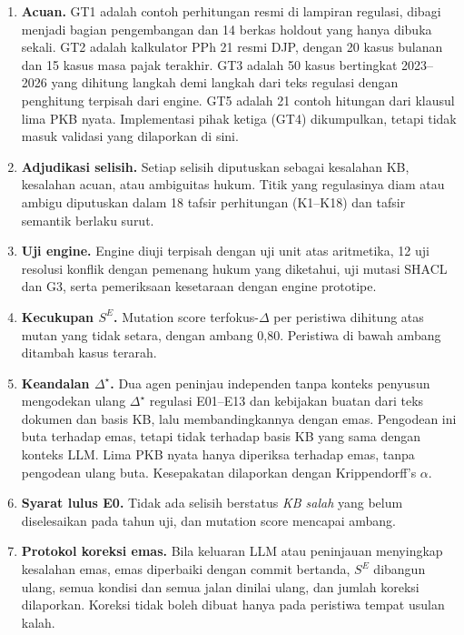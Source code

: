 \documentclass[journal,a4paper]{IEEEtran}
\makeatletter
\DeclareRobustCommand{\en}[1]{{\usefont{\f@encoding}{\f@family}{\f@series}{it}#1\/}}
\newcommand{\emas}{\star}
\newcommand{\SE}{S^{E}}
\makeatother
\begin{document}
\begin{enumerate}[leftmargin=*,nosep]
  \item \textbf{Acuan.} GT1 adalah contoh perhitungan resmi di lampiran regulasi, dibagi menjadi bagian pengembangan dan 14 berkas \en{holdout} yang hanya dibuka sekali. GT2 adalah kalkulator PPh 21 resmi DJP, dengan 20 kasus bulanan dan 15 kasus masa pajak terakhir. GT3 adalah 50 kasus bertingkat 2023--2026 yang dihitung langkah demi langkah dari teks regulasi dengan penghitung terpisah dari \en{engine}. GT5 adalah 21 contoh hitungan dari klausul lima PKB nyata. Implementasi pihak ketiga (GT4) dikumpulkan, tetapi tidak masuk validasi yang dilaporkan di sini.
  \item \textbf{Adjudikasi selisih.} Setiap selisih diputuskan sebagai kesalahan KB, kesalahan acuan, atau ambiguitas hukum. Titik yang regulasinya diam atau ambigu diputuskan dalam 18 tafsir perhitungan (K1--K18) dan tafsir semantik berlaku surut.
  \item \textbf{Uji \en{engine}.} \en{Engine} diuji terpisah dengan uji unit atas aritmetika, 12 uji resolusi konflik dengan pemenang hukum yang diketahui, uji mutasi SHACL dan G3, serta pemeriksaan kesetaraan dengan \en{engine} prototipe.
  \item \textbf{Kecukupan $\SE$.} \en{Mutation score} terfokus-$\Delta$ per peristiwa dihitung atas mutan yang tidak setara, dengan ambang 0,80. Peristiwa di bawah ambang ditambah kasus terarah.
  \item \textbf{Keandalan $\Delta^{\emas}$.} Dua agen peninjau independen tanpa konteks penyusun mengodekan ulang $\Delta^{\emas}$ regulasi E01--E13 dan kebijakan buatan dari teks dokumen dan basis KB, lalu membandingkannya dengan emas. Pengodean ini buta terhadap emas, tetapi tidak terhadap basis KB yang sama dengan konteks LLM. Lima PKB nyata hanya diperiksa terhadap emas, tanpa pengodean ulang buta. Kesepakatan dilaporkan dengan Krippendorff's $\alpha$.
  \item \textbf{Syarat lulus E0.} Tidak ada selisih berstatus \emph{KB salah} yang belum diselesaikan pada tahun uji, dan \en{mutation score} mencapai ambang.
  \item \textbf{Protokol koreksi emas.} Bila keluaran LLM atau peninjauan menyingkap kesalahan emas, emas diperbaiki dengan \en{commit} bertanda, $\SE$ dibangun ulang, semua kondisi dan semua jalan dinilai ulang, dan jumlah koreksi dilaporkan. Koreksi tidak boleh dibuat hanya pada peristiwa tempat usulan kalah.
\end{enumerate}
\end{document}
